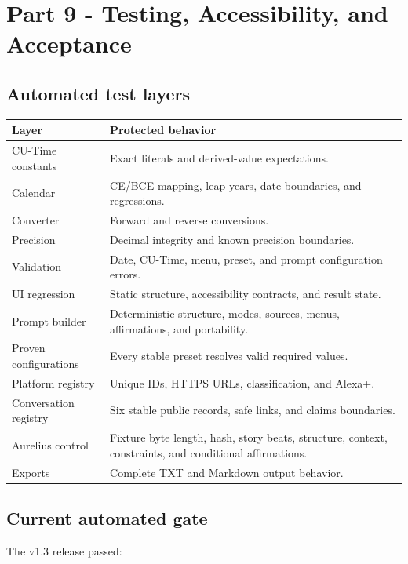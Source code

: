 \documentclass[11pt,letterpaper]{article}
\begin{document}
\section{Part 9 - Testing, Accessibility, and Acceptance}

\subsection{Automated test layers}

\begin{longtable}{L{2.1in}L{4.3in}}
\toprule
\textbf{Layer} & \textbf{Protected behavior} \\
\midrule
CU-Time constants & Exact literals and derived-value expectations. \\
Calendar & CE/BCE mapping, leap years, date boundaries, and regressions. \\
Converter & Forward and reverse conversions. \\
Precision & Decimal integrity and known precision boundaries. \\
Validation & Date, CU-Time, menu, preset, and prompt configuration errors. \\
UI regression & Static structure, accessibility contracts, and result state. \\
Prompt builder & Deterministic structure, modes, sources, menus, affirmations, and portability. \\
Proven configurations & Every stable preset resolves valid required values. \\
Platform registry & Unique IDs, HTTPS URLs, classification, and Alexa+. \\
Conversation registry & Six stable public records, safe links, and claims boundaries. \\
Aurelius control & Fixture byte length, hash, story beats, structure, context, constraints, and conditional affirmations. \\
Exports & Complete TXT and Markdown output behavior. \\
\bottomrule
\end{longtable}

\subsection{Current automated gate}

The v1.3 release passed:
\end{document}
